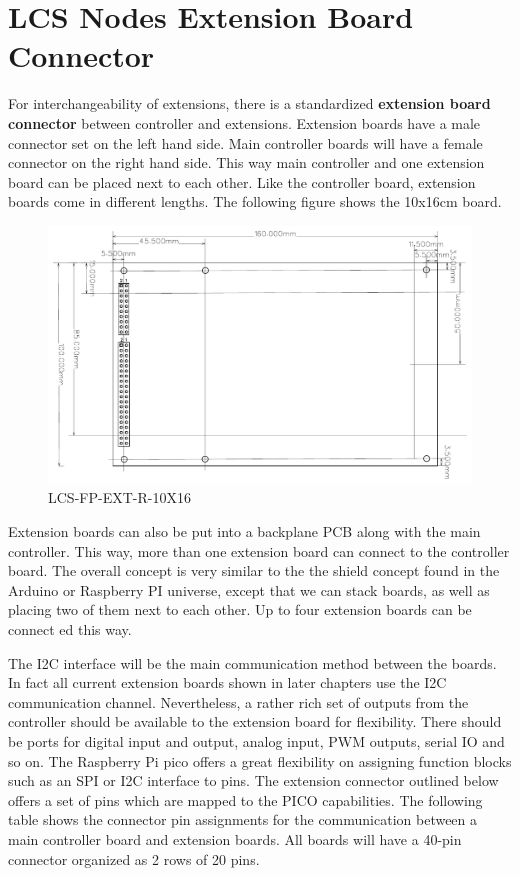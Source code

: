 \section{LCS Nodes Extension Board Connector}

For interchangeability of extensions, there is a standardized \textbf{extension board connector} between controller and extensions. Extension boards have a male connector set on the left hand side. Main controller boards will have a female connector on the right hand side. This way main controller and one extension board can be placed next to each other. Like the controller board, extension boards come in different lengths. The following figure shows the 10x16cm board. 

\begin{figure}[htbp]
    \centering
    \includegraphics[page=1, scale=0.7]{./Figures/LCS-FP-EXT-L-10X16.pdf}
    \caption{LCS-FP-EXT-R-10X16}
\end{figure}

Extension boards can also be put into a backplane PCB along with the main controller. This way, more than one extension board can connect to the controller board. The overall concept is very similar to the the shield concept found in the Arduino or Raspberry PI universe, except that we can stack boards, as well as placing two of them next to each other. Up to four extension boards can be connect ed this way.

The I2C interface will be the main communication method between the boards. In fact all current extension boards shown in later chapters use the I2C communication channel. Nevertheless, a rather rich set of outputs from the controller should be available to the extension board for flexibility. There should be ports for digital input and output, analog input, PWM outputs, serial IO and so on. The Raspberry Pi pico offers a great flexibility on assigning function blocks such as an SPI or I2C interface to pins. The extension connector outlined below offers a set of pins which are mapped to the PICO capabilities. The following table shows the connector pin assignments for the communication between a main controller board and extension boards. All boards will have a 40-pin connector organized as 2 rows of 20 pins.

